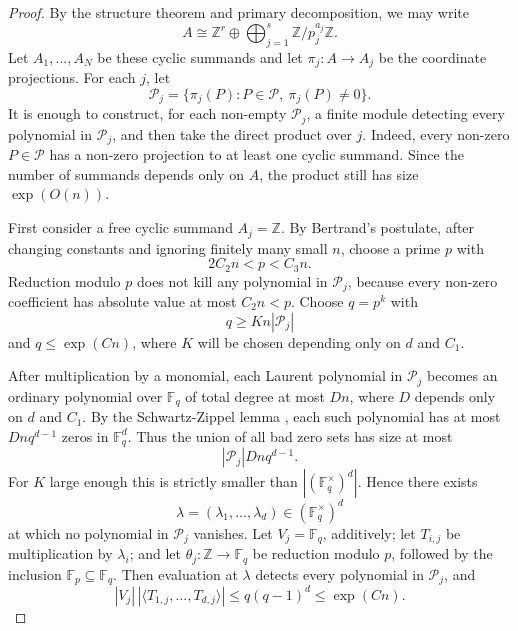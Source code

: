 \documentclass[11pt]{article}
\newcommand{\Z}{\mathbb Z}
\newcommand{\F}{\mathbb F}
\begin{document}
\begin{proof}
By the structure theorem and primary decomposition, we may write
\[
A\cong \Z^r\oplus\bigoplus_{j=1}^s\Z/p_j^{a_j}\Z.
\]
Let \(A_1,\ldots,A_N\) be these cyclic summands and let \(\pi_j:A\to A_j\) be the coordinate projections. For each \(j\), let
\[
\mathcal P_j=\{\pi_j(P):P\in\mathcal P,\ \pi_j(P)\neq 0\}.
\]
It is enough to construct, for each non-empty \(\mathcal P_j\), a finite module detecting every polynomial in \(\mathcal P_j\), and then take the direct product over \(j\). Indeed, every non-zero \(P\in\mathcal P\) has a non-zero projection to at least one cyclic summand. Since the number of summands depends only on \(A\), the product still has size \(\exp(O(n))\).

First consider a free cyclic summand \(A_j=\Z\). By Bertrand's postulate, after changing constants and ignoring finitely many small \(n\), choose a prime \(p\) with
\[
2C_2n<p<C_3n.
\]
Reduction modulo \(p\) does not kill any polynomial in \(\mathcal P_j\), because every non-zero coefficient has absolute value at most \(C_2n<p\). Choose \(q=p^k\) with
\[
q\ge Kn|\mathcal P_j|
\]
and \(q\le \exp(Cn)\), where \(K\) will be chosen depending only on \(d\) and \(C_1\).

After multiplication by a monomial, each Laurent polynomial in \(\mathcal P_j\) becomes an ordinary polynomial over \(\F_q\) of total degree at most \(Dn\), where \(D\) depends only on \(d\) and \(C_1\). By the Schwartz-Zippel lemma \cite{Schwartz1980,Zippel1979}, each such polynomial has at most \(Dnq^{d-1}\) zeros in \(\F_q^d\). Thus the union of all bad zero sets has size at most
\[
|\mathcal P_j|Dnq^{d-1}.
\]
For \(K\) large enough this is strictly smaller than \(|(\F_q^\times)^d|\). Hence there exists
\[
\lambda=(\lambda_1,\ldots,\lambda_d)\in(\F_q^\times)^d
\]
at which no polynomial in \(\mathcal P_j\) vanishes. Let \(V_j=\F_q\), additively; let \(T_{i,j}\) be multiplication by \(\lambda_i\); and let \(\theta_j:\Z\to\F_q\) be reduction modulo \(p\), followed by the inclusion \(\F_p\subseteq\F_q\). Then evaluation at \(\lambda\) detects every polynomial in \(\mathcal P_j\), and
\[
|V_j|\,|\langle T_{1,j},\ldots,T_{d,j}\rangle|\le q(q-1)^d\le \exp(Cn).
\]


\end{proof}
\end{document}

